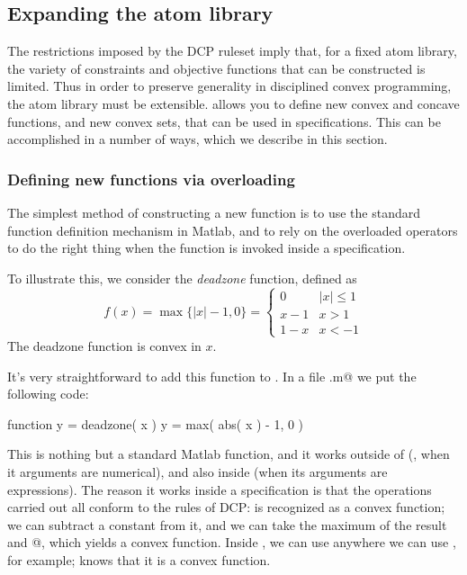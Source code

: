 \documentclass[12pt]{article}
\begin{document}
\subsection{Expanding the \cvx atom library}

The restrictions imposed by the DCP ruleset imply that,
for a fixed atom library, the variety of constraints and objective 
functions that can be constructed is limited.
Thus in order to preserve generality in
disciplined convex programming, the atom library must be extensible.
\cvx allows
you to define new convex and concave functions, and new convex sets, 
that can be used in \cvx specifications. 
This can be accomplished in a number of
ways, which we describe in this section.

\subsubsection{Defining new functions via overloading}
\label{s-new-fcts}

The simplest method of constructing a new function is to use the 
standard function definition mechanism in Matlab, and to rely on
the overloaded operators to do the right thing when the function is
invoked inside a \cvx specification.

To illustrate this, we consider the \emph{deadzone} function,
defined as
\[
f(x) = \max \{ |x|-1, 0 \} =
\left\{ \begin{array}{ll}
0 & |x| \leq 1\\
x-1 & x > 1\\
1-x & x <-1
\end{array}\right.
\]
The deadzone function is convex in $x$.  

It's very straightforward to add this function to \cvx.   In a file
\verb@deadzone.m@ we put the following code:
\begin{code}
	function y = deadzone( x )
	y = max( abs( x ) - 1, 0 )
\end{code}
This is nothing but a standard Matlab function, and it works
outside of \cvx 
(\ie, when it arguments are numerical), and also inside
\cvx (when its arguments are expressions).
The reason it works inside a \cvx specification is that the operations
carried out all conform to the rules of DCP:
\verb@abs@ is recognized as a convex function; we can subtract 
a constant from it, and we can take the maximum of the result and 
@, which yields a convex function.
Inside \cvx, we can use \verb@deadzone@ anywhere we can
use \verb@norm@, for example; 
\cvx knows that it is a convex function.
\end{document}
